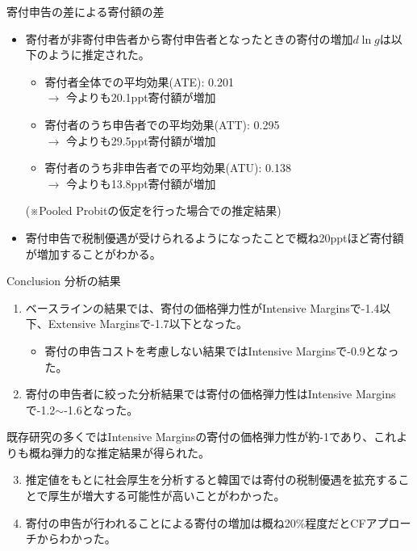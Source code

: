 \documentclass[dvipdfmx,10pt]{beamer}
\begin{document}
\begin{frame}{寄付申告の差による寄付額の差}
	\begin{itemize}
		\item 寄付者が非寄付申告者から寄付申告者となったときの寄付の増加$d \ln g$は以下のように推定された。
		\begin{itemize}
			\item 寄付者全体での平均効果(ATE): 0.201\\
			$\to$ 今よりも20.1ppt寄付額が増加
			\item 寄付者のうち申告者での平均効果(ATT): 0.295\\
			$\to$ 今よりも29.5ppt寄付額が増加
			\item 寄付者のうち非申告者での平均効果(ATU): 0.138\\
			$\to$ 今よりも13.8ppt寄付額が増加
		\end{itemize}
		(※Pooled Probitの仮定を行った場合での推定結果)
		\item 寄付申告で税制優遇が受けられるようになったことで概ね20pptほど寄付額が増加することがわかる。
	\end{itemize}
\end{frame}

	\begin{frame}{Conclusion}
	分析の結果
	\begin{enumerate}
		\item ベースラインの結果では、寄付の価格弾力性がIntensive Marginsで-1.4以下、Extensive Marginsで-1.7以下となった。
		\begin{itemize}
			\item 寄付の申告コストを考慮しない結果ではIntensive Marginsで-0.9となった。
		\end{itemize}
		\item 寄付の申告者に絞った分析結果では寄付の価格弾力性はIntensive Marginsで-1.2\(\sim\)-1.6となった。
	\end{enumerate}
	既存研究の多くではIntensive Marginsの寄付の価格弾力性が約-1であり、これよりも概ね弾力的な推定結果が得られた。
	\begin{enumerate}
		\setcounter{enumi}{2}
		\item 推定値をもとに社会厚生を分析すると韓国では寄付の税制優遇を拡充することで厚生が増大する可能性が高いことがわかった。
		\item 寄付の申告が行われることによる寄付の増加は概ね20\%程度だとCFアプローチからわかった。
	\end{enumerate}
\end{frame}
\end{document}
